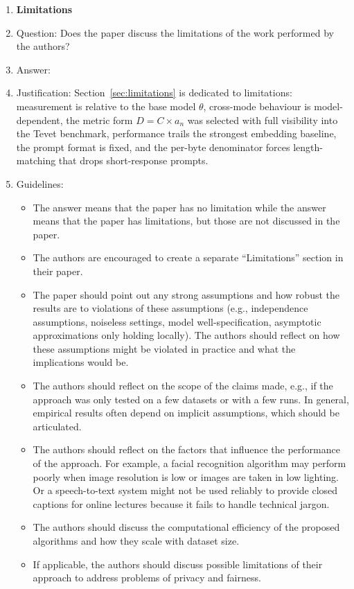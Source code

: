 \begin{enumerate}
\item {\bf Limitations}
    \item[] Question: Does the paper discuss the limitations of the work performed by the authors?
    \item[] Answer: \answerYes{}
    \item[] Justification: Section~\ref{sec:limitations} is dedicated to limitations: measurement is relative to the base model $\theta$, cross-mode behaviour is model-dependent, the metric form $D=C\times a_n$ was selected with full visibility into the Tevet benchmark, performance trails the strongest embedding baseline, the prompt format is fixed, and the per-byte denominator forces length-matching that drops short-response prompts.
    \item[] Guidelines:
    \begin{itemize}
        \item The answer \answerNA{} means that the paper has no limitation while the answer \answerNo{} means that the paper has limitations, but those are not discussed in the paper.
        \item The authors are encouraged to create a separate ``Limitations'' section in their paper.
        \item The paper should point out any strong assumptions and how robust the results are to violations of these assumptions (e.g., independence assumptions, noiseless settings, model well-specification, asymptotic approximations only holding locally). The authors should reflect on how these assumptions might be violated in practice and what the implications would be.
        \item The authors should reflect on the scope of the claims made, e.g., if the approach was only tested on a few datasets or with a few runs. In general, empirical results often depend on implicit assumptions, which should be articulated.
        \item The authors should reflect on the factors that influence the performance of the approach. For example, a facial recognition algorithm may perform poorly when image resolution is low or images are taken in low lighting. Or a speech-to-text system might not be used reliably to provide closed captions for online lectures because it fails to handle technical jargon.
        \item The authors should discuss the computational efficiency of the proposed algorithms and how they scale with dataset size.
        \item If applicable, the authors should discuss possible limitations of their approach to address problems of privacy and fairness.

\end{itemize}
\end{enumerate}
